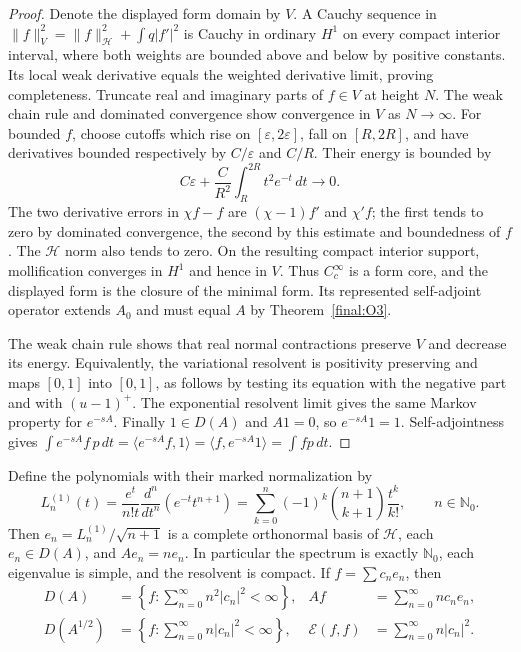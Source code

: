\begin{proof}
Denote the displayed form domain by $V$.  A Cauchy sequence in
$\|f\|_V^2=\|f\|_{\mathcal H}^2+\int q|f'|^2$ is Cauchy in
ordinary $H^1$ on every compact interior interval, where both weights
are bounded above and below by positive constants.  Its local weak
derivative equals the weighted derivative limit, proving completeness.
Truncate real and imaginary parts of $f\in V$ at height $N$.
The weak chain rule and dominated convergence show convergence in
$V$ as $N\to\infty$.  For bounded $f$, choose cutoffs which rise on
$[\varepsilon,2\varepsilon]$, fall on $[R,2R]$, and have derivatives
bounded respectively by $C/\varepsilon$ and $C/R$.  Their energy is
bounded by
\[
 C\varepsilon+\frac{C}{R^2}\int_R^{2R}t^2e^{-t}\,dt\longrightarrow0.
\]
The two derivative errors in $\chi f-f$ are
$(\chi-1)f'$ and $\chi'f$; the first tends to zero by dominated
convergence, the second by this estimate and boundedness of $f$.
The $\mathcal H$ norm also tends to zero.  On the resulting compact
interior support, mollification converges in $H^1$ and hence in $V$.
Thus $C_c^\infty$ is a form core, and the displayed form is the
closure of the minimal form.  Its represented self-adjoint operator
extends $A_0$ and must equal $A$ by Theorem~\ref{final:O3}.

The weak chain rule shows that real normal contractions preserve $V$
and decrease its energy.  Equivalently, the variational resolvent is
positivity preserving and maps $[0,1]$ into $[0,1]$, as follows by
testing its equation with the negative part and with $(u-1)^+$.
The exponential resolvent limit gives the same Markov property for
$e^{-sA}$.  Finally $1\in D(A)$ and $A1=0$, so $e^{-sA}1=1$.
Self-adjointness gives
$\int e^{-sA}f\,p\,dt=\langle e^{-sA}f,1\rangle
=\langle f,e^{-sA}1\rangle=\int fp\,dt$.
\end{proof}

\begin{theorem}
\label{final:O3-spectrum}
Define the polynomials with their marked normalization by
\begin{equation}\label{final:O3-laguerre}
 L_n^{(1)}(t)=\frac{e^t}{n!t}\frac{d^n}{dt^n}
       (e^{-t}t^{n+1})
 =\sum_{k=0}^n(-1)^k\binom{n+1}{k+1}\frac{t^k}{k!},
 \qquad n\in\mathbb N_0.
\end{equation}
Then $e_n=L_n^{(1)}/\sqrt{n+1}$ is a complete orthonormal basis of
$\mathcal H$, each $e_n\in D(A)$, and $Ae_n=ne_n$.
In particular the spectrum is exactly $\mathbb N_0$, each eigenvalue
is simple, and the resolvent is compact.  If $f=\sum c_ne_n$, then
\begin{align}
 D(A)&=\left\{f:\sum_{n=0}^\infty n^2|c_n|^2<\infty\right\},
 &Af&=\sum_{n=0}^\infty nc_ne_n,\label{final:O3-spectral-domain}\\
 D(A^{1/2})&=\left\{f:\sum_{n=0}^\infty n|c_n|^2<\infty\right\},
 &\mathcal E(f,f)&=\sum_{n=0}^\infty n|c_n|^2.
 \nonumber
\end{align}
\end{theorem}

